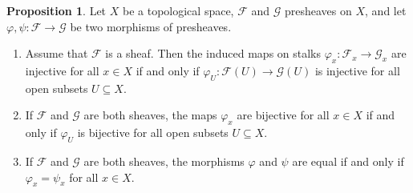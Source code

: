 \documentclass[12pt,a4paper]{book}
\newenvironment{enu}{\begin{enumerate}[(1)]}{\end{enumerate}}
\theoremstyle{definition}
\newtheorem{prop}[defn]{Proposition}
\begin{document}
\begin{prop}
    Let $X$ be a topological space, $\mathscr{F}$ and $\mathscr{G}$ presheaves on $X$, and let $\varphi, \psi: \mathscr{F} \rightarrow \mathscr{G}$ be two morphisms of presheaves.
    \begin{enu}
        \item Assume that $\mathscr{F}$ is a sheaf. Then the induced maps on stalks $\varphi_x: \mathscr{F}_x \rightarrow \mathscr{G}_x$ are injective for all $x \in X$ if and only if $\varphi_U: \mathscr{F}(U) \rightarrow \mathscr{G}(U)$ is injective for all open subsets $U \subseteq X$.
        \item If $\mathscr{F}$ and $\mathscr{G}$ are both sheaves, the maps $\varphi_x$ are bijective for all $x \in X$ if and only if $\varphi_U$ is bijective for all open subsets $U \subseteq X$.
        \item If $\mathscr{F}$ and $\mathscr{G}$ are both sheaves, the morphisms $\varphi$ and $\psi$ are equal if and only if $\varphi_x=\psi_x$ for all $x \in X$.
    \end{enu}
    \label{proposition:characterizations of morphism between sheaves}
\end{prop}
\end{document}
